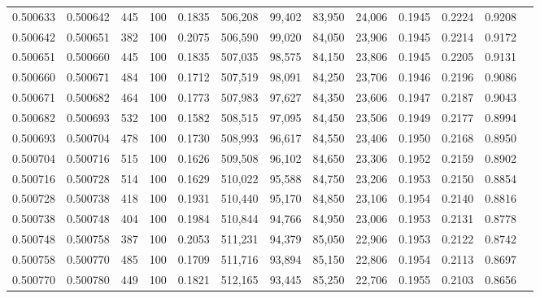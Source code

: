 \begin{tabular}{rrrrrrrrrrrrr}
0.500633 & 0.500642 &   445 & 100 &                                     0.1835 & 506,208 &  99,402 &  83,950 &  24,006 & 0.1945 & 0.2224 & 0.9208 \\
0.500642 & 0.500651 &   382 & 100 &                                     0.2075 & 506,590 &  99,020 &  84,050 &  23,906 & 0.1945 & 0.2214 & 0.9172 \\
0.500651 & 0.500660 &   445 & 100 &                                     0.1835 & 507,035 &  98,575 &  84,150 &  23,806 & 0.1945 & 0.2205 & 0.9131 \\
0.500660 & 0.500671 &   484 & 100 &                                     0.1712 & 507,519 &  98,091 &  84,250 &  23,706 & 0.1946 & 0.2196 & 0.9086 \\
0.500671 & 0.500682 &   464 & 100 &                                     0.1773 & 507,983 &  97,627 &  84,350 &  23,606 & 0.1947 & 0.2187 & 0.9043 \\
0.500682 & 0.500693 &   532 & 100 &                                     0.1582 & 508,515 &  97,095 &  84,450 &  23,506 & 0.1949 & 0.2177 & 0.8994 \\
0.500693 & 0.500704 &   478 & 100 &                                     0.1730 & 508,993 &  96,617 &  84,550 &  23,406 & 0.1950 & 0.2168 & 0.8950 \\
0.500704 & 0.500716 &   515 & 100 &                                     0.1626 & 509,508 &  96,102 &  84,650 &  23,306 & 0.1952 & 0.2159 & 0.8902 \\
0.500716 & 0.500728 &   514 & 100 &                                     0.1629 & 510,022 &  95,588 &  84,750 &  23,206 & 0.1953 & 0.2150 & 0.8854 \\
0.500728 & 0.500738 &   418 & 100 &                                     0.1931 & 510,440 &  95,170 &  84,850 &  23,106 & 0.1954 & 0.2140 & 0.8816 \\
0.500738 & 0.500748 &   404 & 100 &                                     0.1984 & 510,844 &  94,766 &  84,950 &  23,006 & 0.1953 & 0.2131 & 0.8778 \\
0.500748 & 0.500758 &   387 & 100 &                                     0.2053 & 511,231 &  94,379 &  85,050 &  22,906 & 0.1953 & 0.2122 & 0.8742 \\
0.500758 & 0.500770 &   485 & 100 &                                     0.1709 & 511,716 &  93,894 &  85,150 &  22,806 & 0.1954 & 0.2113 & 0.8697 \\
0.500770 & 0.500780 &   449 & 100 &                                     0.1821 & 512,165 &  93,445 &  85,250 &  22,706 & 0.1955 & 0.2103 & 0.8656 \\

\end{tabular}
